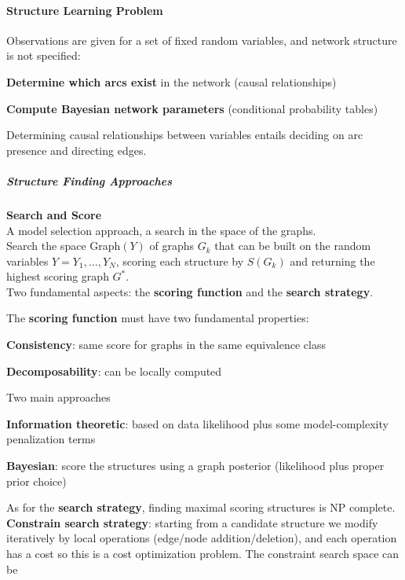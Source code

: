 \documentclass[10pt]{report}
\begin{document}
\paragraph{Structure Learning Problem} Observations are given for a set of fixed random variables, and network structure is not specified:\begin{list}{}{}
	\item \textbf{Determine which arcs exist} in the network (causal relationships)
	\item \textbf{Compute Bayesian network parameters} (conditional probability tables)
\end{list}
Determining causal relationships between variables entails deciding on arc presence and directing edges.
\subparagraph{Structure Finding Approaches}\begin{list}{}{}
	\item \textbf{Search and Score}\\A model selection approach, a search in the space of the graphs.\\
	Search the space Graph$(Y)$ of graphs $G_k$ that can be built on the random variables $Y = Y_1,\ldots,Y_N$, scoring each structure by $S(G_k)$ and returning the highest scoring graph $G^*$.\\Two fundamental aspects: the \textbf{scoring function} and the \textbf{search strategy}.
	\begin{multicols}{2}
	The \textbf{scoring function} must have two fundamental properties:\begin{list}{}{}
		\item \textbf{Consistency}: same score for graphs in the same equivalence class
		\item \textbf{Decomposability}: can be locally computed
	\end{list}
	Two main approaches\begin{list}{}{}
		\item \textbf{Information theoretic}: based on data likelihood plus some model-complexity penalization terms
		\item \textbf{Bayesian}: score the structures using a graph posterior (likelihood plus proper prior choice)
	\end{list}
	\columnbreak
	As for the \textbf{search strategy}, finding maximal scoring structures is NP complete.\\
	\textbf{Constrain search strategy}: starting from a candidate structure we modify iteratively by local operations (edge/node addition/deletion), and each operation has a cost so this is a cost optimization problem. The constraint search space can be\begin{list}{}{}

\end{list}
\end{multicols}
\end{list}
\end{document}
